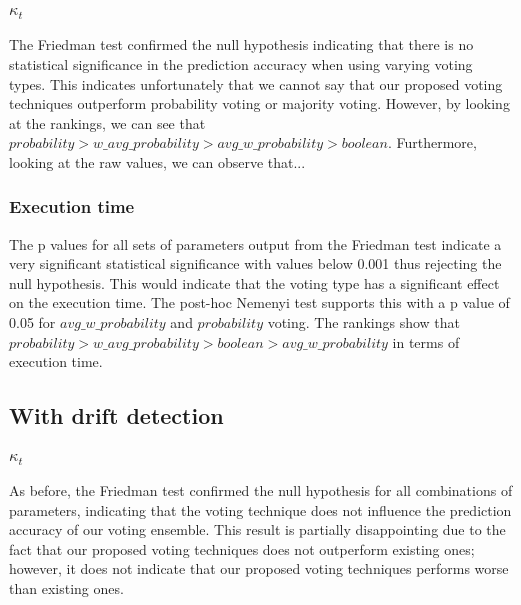 \subsubsection{$\kappa_t$}
The Friedman test confirmed the null hypothesis indicating that there is no statistical significance in the prediction accuracy when using varying voting types. This indicates unfortunately that we cannot say that our proposed voting techniques outperform probability voting or majority voting. However, by looking at the rankings, we can see that $probability > w\_avg\_probability > avg\_w\_probability > boolean$. Furthermore, looking at the raw values, we can observe that...

\subsubsection{Execution time}
The p values for all sets of parameters output from the Friedman test indicate a very significant statistical significance with values below 0.001 thus rejecting the null hypothesis. This would indicate that the voting type has a significant effect on the execution time. The post-hoc Nemenyi test supports this with a p value of 0.05 for $avg\_w\_probability$ and $probability$ voting.
The rankings show that $probability > w\_avg\_probability > boolean > avg\_w\_probability$ in terms of execution time.

\subsection{With drift detection}

\subsubsection{$\kappa_t$}
As before, the Friedman test confirmed the null hypothesis for all combinations of parameters, indicating that the voting technique does not influence the prediction accuracy of our voting ensemble. This result is partially disappointing due to the fact that our proposed voting techniques does not outperform existing ones; however, it does not indicate that our proposed voting techniques performs worse than existing ones.

